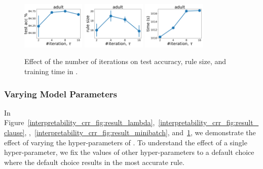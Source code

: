 \begin{figure}
	\subfloat
	{\includegraphics[width=0.27\textwidth]{figures/interpretability/relaxed-cnf/adult_test_accuracy_vary_iteration.pdf}}
	\subfloat
	{\includegraphics[width=0.27\textwidth]{figures/interpretability/relaxed-cnf/adult_rule_size_vary_iteration.pdf}}
	\subfloat
	{\includegraphics[width=0.27\textwidth]{figures/interpretability/relaxed-cnf/adult_time_vary_iteration.pdf}} 
	\\
	
	
	\caption[Effect of the number of iterations in {\crr}]{Effect of the number of iterations on test accuracy, rule size, and training time in {\crr}. } 
	\label{interpretability_crr_fig:result_iteration}
\end{figure}





	

	\subsubsection{Varying Model Parameters}
	\label{interpretability_crr_sec:model_parameters}
	In Figure~\ref{interpretability_crr_fig:result_lambda},~\ref{interpretability_crr_fig:result_clause}, ,~\ref{interpretability_crr_fig:result_minibatch}, and~\ref{interpretability_crr_fig:result_iteration}, we demonstrate the effect of varying the hyper-parameters of {\crr}. To understand the effect of a single hyper-parameter, we fix the values of other hyper-parameters to a default choice where the default choice results in the most accurate rule. 
	 

